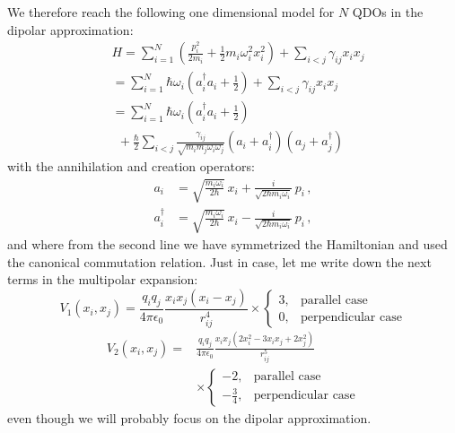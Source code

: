 \documentclass[reprint, amsmath, amssymb, aps]{revtex4-2}
\begin{document}
        We therefore reach the following one dimensional model for $N$ QDOs in the dipolar approximation:
        \begin{equation}
            \begin{split}
                &H = \sum_{i=1}^N\left(\frac{p_i^2}{2m_i}+\frac{1}{2}m_i\omega_i^2 x_i^2\right) + \sum_{i<j}\gamma_{ij}x_ix_j\\
                &= \sum_{i=1}^N\hbar\omega_i\left(a_i^\dagger a_i+\frac{1}{2}\right) + \sum_{i<j}\gamma_{ij}x_ix_j\\
                &= \sum_{i=1}^N\hbar\omega_i\left(a_i^\dagger a_i+\frac{1}{2}\right) \\
                &\ \ +\frac{\hbar}{2}\sum_{i<j}\frac{\gamma_{ij}}{\sqrt{m_im_j\omega_i\omega_j}}\left(a_i+a_i^\dagger\right)\left(a_j+a_j^\dagger\right)
            \end{split}
        \end{equation}
        with the annihilation and creation operators:
        \begin{equation}
            \begin{split}
                a_i &= \sqrt{\frac{m_i\omega_i}{2\hbar}}\,x_i+\frac{i}{\sqrt{2\hbar m_i\omega_i}}\,p_i\,,\\
                a_i^\dagger &= \sqrt{\frac{m_i\omega_i}{2\hbar}}\,x_i-\frac{i}{\sqrt{2\hbar m_i\omega_i}}\,p_i\,,
            \end{split}
        \end{equation}
        and where from the second line we have symmetrized the Hamiltonian and used the canonical commutation relation.
        Just in case, let me write down the next terms in the multipolar expansion:
        \begin{equation}
            V_1(x_i, x_j) = \frac{q_iq_j}{4\pi\epsilon_0}\frac{x_ix_j(x_i-x_j)}{r_{ij}^4}\times
            \begin{cases}
                3, & \text{parallel case} \\
                0, & \text{perpendicular case}
            \end{cases}
        \end{equation}
        \begin{equation}
            \begin{split}
                V_2(x_i, x_j) = &\frac{q_iq_j}{4\pi\epsilon_0}\frac{x_ix_j(2x_i^2-3x_ix_j+2x_j^2)}{r_{ij}^5}\\
                &\times
                \begin{cases}
                    -2, & \text{parallel case} \\
                -\frac{3}{4}, & \text{perpendicular case}
                \end{cases}
            \end{split}
        \end{equation}
        even though we will probably focus on the dipolar approximation.
\end{document}
